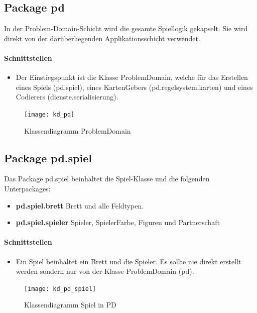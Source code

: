 \documentclass[12pt,halfparskip]{scrartcl}
\begin{document}
\clearpage

\subsection{Package pd}

In der Problem-Domain-Schicht wird die gesamte Spiellogik gekapselt. Sie wird direkt von der darüberliegenden Applikationsschicht verwendet.

\paragraph{Schnittstellen}
\begin{itemize}
	\item Der Einstiegspunkt ist die Klasse ProblemDomain, welche für das Erstellen eines Spiels (pd.spiel), eines KartenGebers (pd.regelsystem.karten) und eines Codierers (dienste.serialisierung).
\end{itemize}

\begin{figure}[H]
	\centering
	\texttt{[image: kd\_pd]}
	\caption{Klassendiagramm ProblemDomain}
	\label{fig:kd_pd}
\end{figure}

\clearpage
\subsection{Package pd.spiel}

Das Package pd.spiel beinhaltet die Spiel-Klasse und die folgenden  Unterpackages:

\begin{itemize}
	\item \textbf{pd.spiel.brett} Brett und alle Feldtypen.
	\item \textbf{pd.spiel.spieler} Spieler, SpielerFarbe, Figuren und Partnerschaft
\end{itemize}

\paragraph{Schnittstellen}
\begin{itemize}
	\item Ein Spiel beinhaltet ein Brett und die Spieler. Es sollte nie direkt erstellt werden sondern nur von der Klasse ProblemDomain (pd).
\end{itemize}

\begin{figure}[H]
	\centering
	\texttt{[image: kd\_pd\_spiel]}
	\caption{Klassendiagramm Spiel in PD}
	\label{fig:kd_pd_spiel}
\end{figure}
\end{document}
